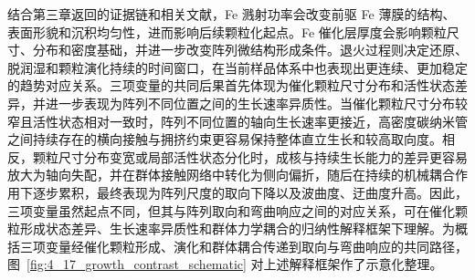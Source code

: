 结合第三章返回的证据链和相关文献，Fe 溅射功率会改变前驱 Fe 薄膜的结构、表面形貌和沉积均匀性，进而影响后续颗粒化起点\cite{Aleksanyan2023RFMagnetron,Zhou2020FeSputterPower}。Fe 催化层厚度会影响颗粒尺寸、分布和密度基础，并进一步改变阵列微结构形成条件\cite{Yang2016ALDThicknessCN,Zhang2017BufferLayer}。退火过程则决定还原、脱润湿和颗粒演化持续的时间窗口，在当前样品体系中也表现出更连续、更加稳定的趋势对应关系\cite{Jung2013PreAnnealingFeCNT,Lee2019CatalystDewetting}。三项变量的共同后果首先体现为催化颗粒尺寸分布和活性状态差异，并进一步表现为阵列不同位置之间的生长速率异质性\cite{Zhang2009Morphology,Liu2021EcoMat}。当催化颗粒尺寸分布较窄且活性状态相对一致时，阵列不同位置的轴向生长速率更接近，高密度碳纳米管之间持续存在的横向接触与拥挤约束更容易保持整体直立生长和较高取向度\cite{Futaba2016SweetSpot,Zhang2007SynchronousGrowthVACNT}。相反，颗粒尺寸分布变宽或局部活性状态分化时，成核与持续生长能力的差异更容易放大为轴向失配，并在群体接触网络中转化为侧向偏折，随后在持续的机械耦合作用下逐步累积，最终表现为阵列尺度的取向下降以及波曲度、迂曲度升高\cite{Zhang2009Morphology,Liu2021EcoMat}。因此，三项变量虽然起点不同，但其与阵列取向和弯曲响应之间的对应关系，可在催化颗粒形成状态差异、生长速率异质性和群体力学耦合的归纳性解释框架下理解。为概括三项变量经催化颗粒形成、演化和群体耦合传递到取向与弯曲响应的共同路径，图~\ref{fig:4_17_growth_contrast_schematic} 对上述解释框架作了示意化整理。

